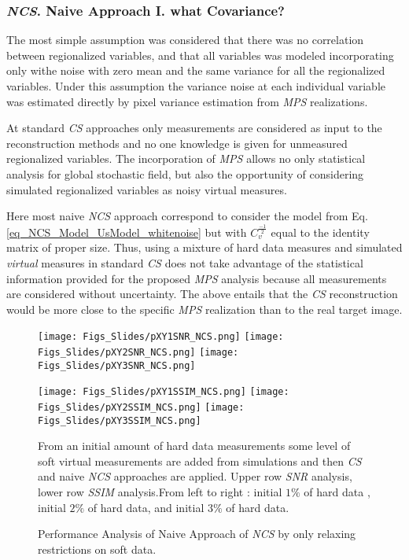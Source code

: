 \subsubsection{\emph{NCS}. Naive Approach I. what Covariance?}

The most simple assumption was considered that there was no correlation between regionalized variables, and that all variables was modeled incorporating only withe noise with zero mean and the same variance for all the regionalized variables. Under this assumption the variance noise at each individual variable was estimated directly by pixel variance estimation from \emph{MPS} realizations.

At standard \emph{CS} approaches only measurements are considered as input to the reconstruction methods and no one knowledge is given for unmeasured regionalized variables. The incorporation of \emph{MPS} allows no only statistical analysis for global stochastic field, but also the opportunity of considering simulated regionalized variables as noisy virtual measures. 

Here most naive \emph{NCS} approach correspond to consider the model from Eq. \eqref{eq_NCS_Model_UsModel_whitenoise} but with $C_{v}^{\frac{-1}{2}}$ equal to the identity matrix of proper size. Thus, using a mixture of hard data measures and simulated \emph{virtual} measures in standard \emph{CS} does not take advantage of the statistical information provided for the proposed \emph{MPS} analysis because all measurements are considered without uncertainty. The above entails that the \emph{CS} reconstruction would be more close to the specific \emph{MPS} realization than to the real target image. 

		\begin{figure}[H]
		\centering
		\texttt{[image: Figs\_Slides/pXY1SNR\_NCS.png]}
		\texttt{[image: Figs\_Slides/pXY2SNR\_NCS.png]}
		\texttt{[image: Figs\_Slides/pXY3SNR\_NCS.png]}

		\texttt{[image: Figs\_Slides/pXY1SSIM\_NCS.png]}
		\texttt{[image: Figs\_Slides/pXY2SSIM\_NCS.png]}
		\texttt{[image: Figs\_Slides/pXY3SSIM\_NCS.png]}

		\caption[Performance Analysis of Naive Approach of \emph{NCS} by relaxing restrictions]{Performance Analysis of Naive Approach of \emph{NCS} by only relaxing restrictions on soft data.} \scriptsize{ From an initial amount of hard data measurements some level of soft virtual measurements are added from simulations and then \emph{CS} and naive \emph{NCS} approaches are applied. Upper row \emph{SNR} analysis, lower row \emph{SSIM} analysis.From left to right  : initial $1 \%$ of hard data , initial $2 \%$ of hard data, and initial $3 \%$ of hard data.}
		\label{fig:Naive0MC1_Performance}
		\end{figure}
		
